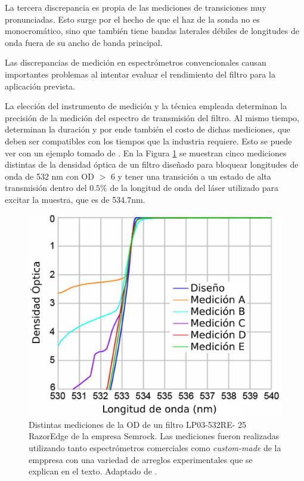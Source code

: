 La tercera 
discrepancia es propia de las mediciones de transiciones muy 
pronunciadas. Esto surge 
por el hecho de que el 
haz de la sonda no es monocromático, sino que también tiene bandas 
laterales débiles de longitudes de onda fuera de su ancho de banda 
principal.

Las discrepancias de medición en espectrómetros convencionales 
causan 
importantes problemas al intentar evaluar el rendimiento del filtro para la 
aplicación prevista. 

La elección del instrumento de medición y la técnica 
empleada determinan la precisión de la medición del espectro de transmisión del 
filtro. Al mismo tiempo, determinan la duración y por ende también el costo de 
dichas mediciones, que deben ser compatibles con los tiempos que la industria 
requiere. Esto se puede ver con un ejemplo tomado de \cite{Semrock}. En la 
Figura \ref{fig:may_dists} se muestran cinco mediciones distintas de 
la densidad óptica de un filtro diseñado para bloquear longitudes de onda de 
532 nm con OD $>$ 6 y tener una transición a un estado de alta transmisión 
dentro del $0.5\%$ de la longitud de onda del láser utilizado para excitar la 
muestra, que es de 534.7nm.


\begin{figure}[H]
	\centering
	\includegraphics[scale=0.8]{Figs/plan_de_tesis/dists_meds.png}
	\caption{Distintas mediciones de la OD de un filtro LP03-532RE-
		25 RazorEdge de la empresa Semrock. Las mediciones fueron realizadas 
		utilizando tanto espectrómetros comerciales como \textit{custom-made} 
		de la emppresa con una variedad de arreglos experimentales que se 
		explican en el texto. Adaptado de 
		\cite{Semrock}.}
	\label{fig:may_dists}
\end{figure}

